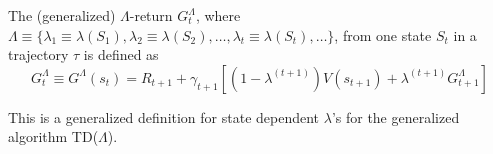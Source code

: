 \documentclass{article}
\begin{document}
\begin{definition}
The (generalized) $\Lambda$-return $G_t^\Lambda$, where $\Lambda \equiv \{\lambda_1 \equiv \lambda(S_1), \lambda_2 \equiv \lambda(S_2), \dots, \lambda_t \equiv \lambda(S_t), \dots\}$, from one state $S_t$ in a trajectory $\tau$ is defined as
\begin{equation}\nonumber
G_t^\Lambda \equiv G^\Lambda(s_t) = R_{t+1} + \gamma_{t+1} [(1 - \lambda^{(t+1)})V(s_{t+1}) + \lambda^{(t+1)}G_{t+1}^\Lambda]
\end{equation}
\end{definition}
This is a generalized definition for state dependent $\lambda$'s for the generalized algorithm TD($\Lambda$).
\par
\end{document}
